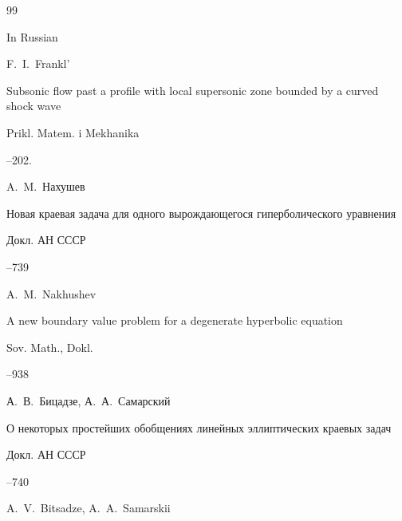 \begin{thebibliography}{99}
\misctransl

\lang In Russian

\by F.~I.~Frankl'

\paper Subsonic flow past a profile with local supersonic zone bounded by a curved shock wave

\jour Prikl. Matem. i Mekhanika




--202.







\by A.~M.~Нахушев 

\paper Новая краевая задача для одного вырождающегося гиперболического уравнения

\jour Докл. АН СССР




--739

\transl

\by A.~M.~Nakhushev

\paper A new boundary value problem for a degenerate hyperbolic equation


\jour Sov. Math., Dokl.



--938 







\by А.~В.~Бицадзе, А.~А.~Самарский 

\paper О некоторых простейших обобщениях линейных эллиптических краевых задач 

\jour Докл. АН СССР




--740

\transl

\by A.~V.~Bitsadze, A.~A.~Samarskii



\end{thebibliography}
